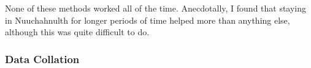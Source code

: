 

None of these methods worked all of the time. Anecdotally, I found that staying in Nuuchahnulth for longer periods of time helped more than anything else, although this was quite difficult to do.

\subsubsection{Data Collation} \label{sec:method:collation}

